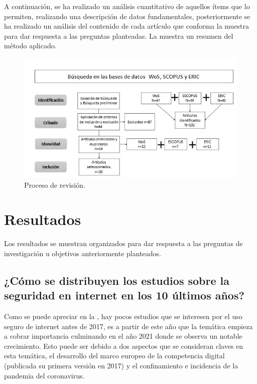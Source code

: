\documentclass[spanish]{textolivre}
\begin{document}
A continuación, se ha realizado un análisis cuantitativo de aquellos ítems que lo permiten, realizando una descripción de datos fundamentales, posteriormente se ha realizado un análisis del contenido de cada artículo que conforma la muestra para dar respuesta a las preguntas planteadas. La  muestra un resumen del método aplicado.

\begin{figure}[h]
\centering
\begin{minipage}{0.75\textwidth}
\includegraphics[width=\textwidth]{Fig3.jpeg}
\caption{Proceso de revisión.}
\label{fig3}
\end{minipage}
\end{figure}

\section{Resultados}\label{sec-fmt-manuscrito}
Los resultados se muestran organizados para dar respuesta a las preguntas de investigación u objetivos anteriormente planteados.


\subsection{¿Cómo se distribuyen los estudios sobre la seguridad en internet en los 10 últimos años?}\label{sec-formato}
Como se puede apreciar en la , hay pocos estudios que se interesen por el uso seguro de internet antes de 2017, es a partir de este año que la temática empieza a cobrar importancia culminando en el año 2021 donde se observa un notable crecimiento. Esto puede ser debido a dos aspectos que se consideran claves en esta temática, el desarrollo del marco europeo de la competencia digital (publicada su primera versión en 2017) y el confinamiento e incidencia de la pandemia del coronavirus.
\end{document}
